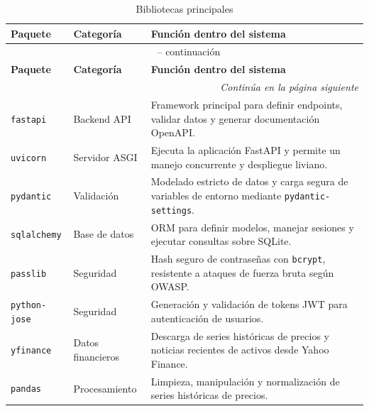 \begin{longtable}{p{2.5cm} p{2.3cm} p{6.5cm}}
  \caption{Bibliotecas principales}
  \label{tab:dependencias} \\

  \toprule
  \textbf{Paquete} & \textbf{Categoría} & \textbf{Función dentro del sistema} \\
  \midrule
  \endfirsthead

  \multicolumn{3}{c}{\tablename\ \thetable{} -- continuación} \\
  \toprule
  \textbf{Paquete} & \textbf{Categoría} & \textbf{Función dentro del sistema} \\
  \midrule
  \endhead

  \midrule
  \multicolumn{3}{r}{\textit{Continúa en la página siguiente}} \\
  \endfoot

  \bottomrule
  \endlastfoot

  \texttt{fastapi} & Backend API &
  Framework principal para definir endpoints, validar datos y generar documentación OpenAPI.  
  \\
  \midrule

  \texttt{uvicorn} & Servidor ASGI &
  Ejecuta la aplicación FastAPI y permite un manejo concurrente y despliegue liviano. \\      
  \midrule

  \texttt{pydantic} & Validación &
  Modelado estricto de datos y carga segura de variables de entorno mediante
  \texttt{pydantic-settings}. \\
  \midrule

  \texttt{sqlalchemy} & Base de datos &
  ORM para definir modelos, manejar sesiones y ejecutar consultas sobre SQLite. \\
  \midrule

  \texttt{passlib} & Seguridad &
  Hash seguro de contraseñas con \texttt{bcrypt}, resistente a ataques de fuerza bruta según  
  OWASP. \\
  \midrule

  \texttt{python-jose} & Seguridad &
  Generación y validación de tokens JWT para autenticación de usuarios. \\
  \midrule

  \texttt{yfinance} & Datos financieros &
  Descarga de series históricas de precios y noticias recientes de activos desde Yahoo        
  Finance. \\
  \midrule

  \texttt{pandas} & Procesamiento &
  Limpieza, manipulación y normalización de series históricas de precios. \\
  \midrule


\end{longtable}
